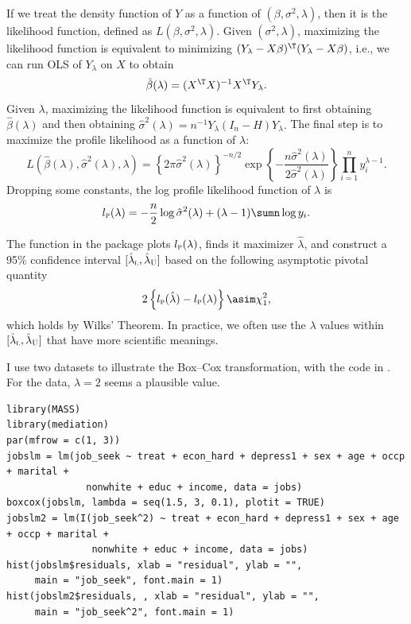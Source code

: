If we treat the density function of $Y$ as a function of $(\beta,\sigma^{2},\lambda)$,
then it is the likelihood function, defined as $L(\beta,\sigma^{2},\lambda).$
Given $(\sigma^{2},\lambda)$, maximizing the likelihood function
is equivalent to minimizing $(Y_{\lambda}-X\beta)^{\T}(Y_{\lambda}-X\beta)$,
i.e., we can run OLS of $Y_{\lambda}$ on $X$ to obtain 
\[
\hat{\beta}(\lambda)=(X^{\T}X)^{-1}X^{\T}Y_{\lambda}.
\]
Given $\lambda$, maximizing the likelihood function is equivalent
to first obtaining $\hat{\beta}(\lambda)$ and then obtaining $\hat{\sigma}^{2}(\lambda)=n^{-1}Y_{\lambda}(I_{n}-H)Y_{\lambda}.$
The final step is to maximize the profile likelihood as a function
of $\lambda$:
\[
L(\hat{\beta}(\lambda),\hat{\sigma}^{2}(\lambda),\lambda)=\left\{ 2\pi\hat{\sigma}^{2}(\lambda)\right\} ^{-n/2}\exp\left\{ -\frac{n\hat{\sigma}^{2}(\lambda)}{2\hat{\sigma}^{2}(\lambda)}\right\} \prod_{i=1}^{n}y_{i}^{\lambda-1}.
\]
Dropping some constants, the log profile likelihood function of $\lambda$
is
\[
l_{\textsc{p}}(\lambda)=-\frac{n}{2}\log\hat{\sigma}^{2}(\lambda)+(\lambda-1)\sumn\log y_{i}.
\]


The  function in the   package  plots $l_{\textsc{p}}(\lambda)$, finds it
maximizer $\hat{\lambda}$, and construct a 95\% confidence
interval $[\hat{\lambda}_{\textsc{l}},\hat{\lambda}_{\textsc{U}}]$
based on the following asymptotic pivotal quantity
\[
2\left\{ l_{\textsc{p}}(\hat{\lambda})-l_{\textsc{p}}(\lambda)\right\} \asim\chi_{1}^{2},
\]
which holds by Wilks' Theorem. In practice, we often use the $\lambda$
values within $[\hat{\lambda}_{\textsc{l}},\hat{\lambda}_{\textsc{U}}]$
that have more scientific meanings.


I use two datasets to illustrate the Box--Cox transformation, with the  code in . For the  data, $\lambda = 2$ seems a plausible value. 
\begin{lstlisting}
library(MASS)
library(mediation)
par(mfrow = c(1, 3))
jobslm = lm(job_seek ~ treat + econ_hard + depress1 + sex + age + occp + marital + 
              nonwhite + educ + income, data = jobs)
boxcox(jobslm, lambda = seq(1.5, 3, 0.1), plotit = TRUE)
jobslm2 = lm(I(job_seek^2) ~ treat + econ_hard + depress1 + sex + age + occp + marital + 
               nonwhite + educ + income, data = jobs)
hist(jobslm$residuals, xlab = "residual", ylab = "", 
     main = "job_seek", font.main = 1)
hist(jobslm2$residuals, , xlab = "residual", ylab = "", 
     main = "job_seek^2", font.main = 1)
\end{lstlisting}

